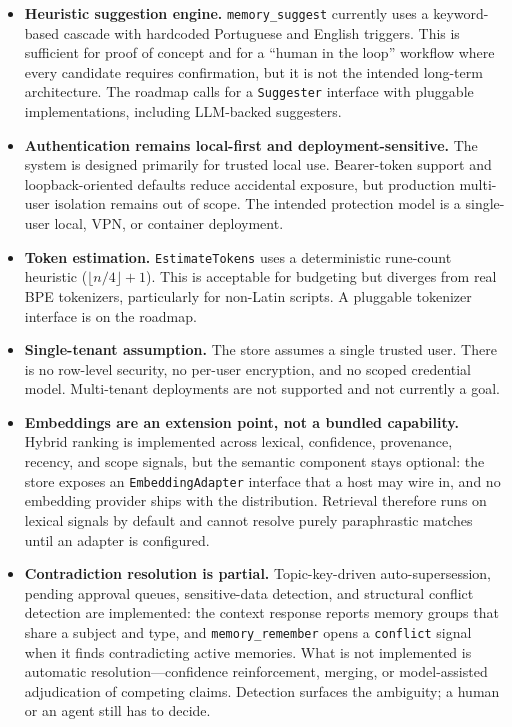 \documentclass[11pt,a4paper]{article}
\begin{document}
\begin{itemize}
 \item \textbf{Heuristic suggestion engine.} \texttt{memory\_suggest} currently uses a keyword-based cascade with hardcoded Portuguese and English triggers. This is sufficient for proof of concept and for a ``human in the loop'' workflow where every candidate requires confirmation, but it is not the intended long-term architecture. The roadmap calls for a \texttt{Suggester} interface with pluggable implementations, including LLM-backed suggesters.
 \item \textbf{Authentication remains local-first and deployment-sensitive.} The system is designed primarily for trusted local use. Bearer-token support and loopback-oriented defaults reduce accidental exposure, but production multi-user isolation remains out of scope. The intended protection model is a single-user local, VPN, or container deployment.
 \item \textbf{Token estimation.} \texttt{EstimateTokens} uses a deterministic rune-count heuristic ($\lfloor n/4 \rfloor + 1$). This is acceptable for budgeting but diverges from real BPE tokenizers, particularly for non-Latin scripts. A pluggable tokenizer interface is on the roadmap.
 \item \textbf{Single-tenant assumption.} The store assumes a single trusted user. There is no row-level security, no per-user encryption, and no scoped credential model. Multi-tenant deployments are not supported and not currently a goal.
 \item \textbf{Embeddings are an extension point, not a bundled capability.} Hybrid ranking is implemented across lexical, confidence, provenance, recency, and scope signals, but the semantic component stays optional: the store exposes an \texttt{EmbeddingAdapter} interface that a host may wire in, and no embedding provider ships with the distribution. Retrieval therefore runs on lexical signals by default and cannot resolve purely paraphrastic matches until an adapter is configured.
 \item \textbf{Contradiction resolution is partial.} Topic-key-driven auto-supersession, pending approval queues, sensitive-data detection, and structural conflict detection are implemented: the context response reports memory groups that share a subject and type, and \texttt{memory\_remember} opens a \texttt{conflict} signal when it finds contradicting active memories. What is not implemented is automatic resolution---confidence reinforcement, merging, or model-assisted adjudication of competing claims. Detection surfaces the ambiguity; a human or an agent still has to decide.

\end{itemize}
\end{document}
